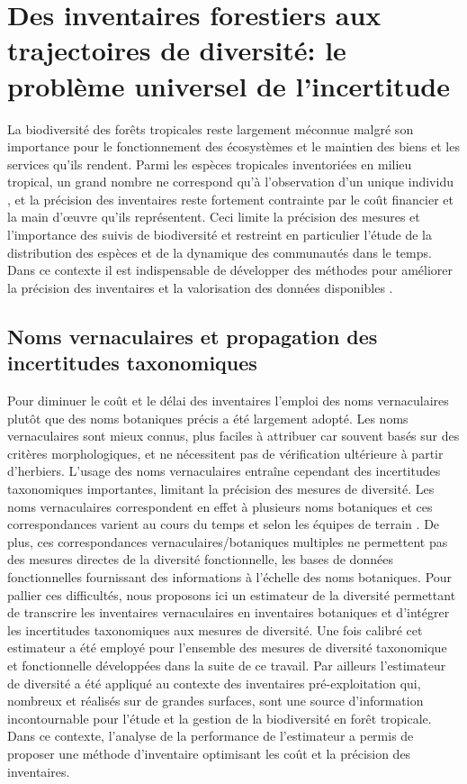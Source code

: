 \documentclass[
  11pt,
  french,
  A4paper,
  extrafontsizes,onecolumn,openright
  ]{memoir}
\begin{document}
\chapter{Des inventaires forestiers aux trajectoires de diversité: le
problème universel de
l'incertitude}\label{des-inventaires-forestiers-aux-trajectoires-de-diversite-le-probleme-universel-de-lincertitude}

La biodiversité des forêts tropicales reste largement méconnue malgré
son importance pour le fonctionnement des écosystèmes et le maintien des
biens et les services qu'ils rendent. Parmi les espèces tropicales
inventoriées en milieu tropical, un grand nombre ne correspond qu'à
l'observation d'un unique individu \autocite{Feeley2011}, et la
précision des inventaires reste fortement contrainte par le coût
financier et la main d'œuvre qu'ils représentent. Ceci limite la
précision des mesures et l'importance des suivis de biodiversité et
restreint en particulier l'étude de la distribution des espèces et de la
dynamique des communautés dans le temps. Dans ce contexte il est
indispensable de développer des méthodes pour améliorer la précision des
inventaires et la valorisation des données disponibles
\autocite{Baraloto2012}.

\section{Noms vernaculaires et propagation des incertitudes
taxonomiques}\label{noms-vernaculaires-et-propagation-des-incertitudes-taxonomiques}

Pour diminuer le coût et le délai des inventaires l'emploi des noms
vernaculaires plutôt que des noms botaniques précis a été largement
adopté. Les noms vernaculaires sont mieux connus, plus faciles à
attribuer car souvent basés sur des critères morphologiques, et ne
nécessitent pas de vérification ultérieure à partir d'herbiers. L'usage
des noms vernaculaires entraîne cependant des incertitudes taxonomiques
importantes, limitant la précision des mesures de diversité. Les noms
vernaculaires correspondent en effet à plusieurs noms botaniques et ces
correspondances varient au cours du temps et selon les équipes de
terrain \autocite{Oldeman1968}. De plus, ces correspondances
vernaculaires/botaniques multiples ne permettent pas des mesures
directes de la diversité fonctionnelle, les bases de données
fonctionnelles fournissant des informations à l'échelle des noms
botaniques. Pour pallier ces difficultés, nous proposons ici un
estimateur de la diversité permettant de transcrire les inventaires
vernaculaires en inventaires botaniques et d'intégrer les incertitudes
taxonomiques aux mesures de diversité. Une fois calibré cet estimateur a
été employé pour l'ensemble des mesures de diversité taxonomique et
fonctionnelle développées dans la suite de ce travail. Par ailleurs
l'estimateur de diversité a été appliqué au contexte des inventaires
pré-exploitation qui, nombreux et réalisés sur de grandes surfaces, sont
une source d'information incontournable
\autocites{TerSteege2000}{Guitet2014} pour l'étude et la gestion de la
biodiversité en forêt tropicale. Dans ce contexte, l'analyse de la
performance de l'estimateur a permis de proposer une méthode
d'inventaire optimisant les coût et la précision des inventaires.
\end{document}
